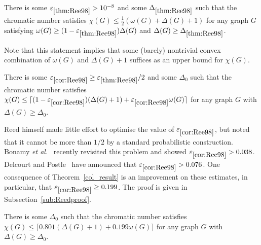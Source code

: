 \begin{theorem}\label{thm:Ree98}
There is some $\varepsilon_{\ref{thm:Ree98}}>10^{-8}$ and some $\Delta_{\ref{thm:Ree98}}$ such that the chromatic number satisfies $\chi(G) \le \frac12(\omega(G)+\Delta(G)+1)$ for any graph $G$ satisfying $\omega(G) \ge (1-\varepsilon_{\ref{thm:Ree98}})\Delta(G)$ and $\Delta(G)\ge \Delta_{\ref{thm:Ree98}}$.
\end{theorem}

\noindent
Note that this statement implies that some (barely) nontrivial convex combination of $\omega(G)$ and $\Delta(G)+1$ suffices as an upper bound for $\chi(G)$.

\begin{cor}\label{cor:Ree98}
There is some $\varepsilon_{\ref{cor:Ree98}}\ge \varepsilon_{\ref{thm:Ree98}}/2$ and some $\Delta_0$ such that the chromatic number satisfies  $\chi(G) \le \lceil (1-\varepsilon_{\ref{cor:Ree98}})(\Delta(G)+1)+\varepsilon_{\ref{cor:Ree98}}\omega(G)\rceil$ for any graph $G$ with $\Delta(G)\ge \Delta_0$.
\end{cor}

\noindent
Reed himself made little effort to optimise the value of $\varepsilon_{\ref{cor:Ree98}}$, but noted that it cannot be more than $1/2$ by a standard probabilistic construction.
Bonamy {\em et al.}~\cite{BPP18+} recently revisited this problem and showed $\varepsilon_{\ref{cor:Ree98}} > 0.038$. Delcourt and Postle~\cite{DePo17} have announced that $\varepsilon_{\ref{cor:Ree98}} > 0.076$. One consequence of Theorem~\ref{col_result} is an improvement on these estimates, in particular, that $\varepsilon_{\ref{cor:Ree98}} \ge 0.199$. The proof is given in Subsection~\ref{sub:Reedproof}.

\begin{theorem}
\label{Reed_bound}
There is some $\Delta_0$ such that the chromatic number satisfies $\chi(G) \le \lceil 0.801(\Delta(G)+1)+0.199\omega(G)\rceil$ for any graph $G$ with $\Delta(G)\ge \Delta_0$.
\end{theorem}









